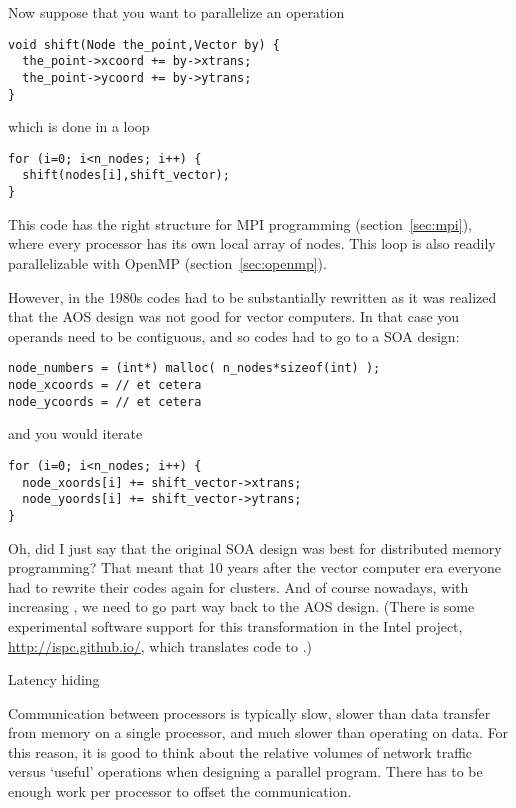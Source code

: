 Now suppose that you want to parallelize an operation
\lstset{language=C}
\begin{lstlisting}
void shift(Node the_point,Vector by) {
  the_point->xcoord += by->xtrans;
  the_point->ycoord += by->ytrans;
}
\end{lstlisting}
which is done in a loop
\lstset{language=C}
\begin{lstlisting}
for (i=0; i<n_nodes; i++) {
  shift(nodes[i],shift_vector);
}
\end{lstlisting}
This code has the right structure for MPI programming
(section~\ref{sec:mpi}), where every processor has its own local array
of nodes. This loop is also readily parallelizable with OpenMP
(section~\ref{sec:openmp}).

However, in the 1980s codes had to be substantially rewritten as it
was realized that the AOS design was not good for vector computers.
In that case you operands need to be contiguous, and so codes had to 
go to a SOA design:
\lstset{language=C}
\begin{lstlisting}
node_numbers = (int*) malloc( n_nodes*sizeof(int) );
node_xcoords = // et cetera
node_ycoords = // et cetera
\end{lstlisting}
and you would iterate
\lstset{language=C}
\begin{lstlisting}
for (i=0; i<n_nodes; i++) {
  node_xoords[i] += shift_vector->xtrans;
  node_yoords[i] += shift_vector->ytrans;
}
\end{lstlisting}

Oh, did I just say that the original SOA design was best for
distributed memory programming?  That meant that 10 years after the
vector computer era everyone had to rewrite their codes again for
clusters. And of course nowadays, with
increasing , we need to go part way back to
the AOS design.
(There is some experimental software support for this transformation
in the Intel  project, \url{http://ispc.github.io/},
which translates  code to .)

 {Latency hiding}
\label{sec:comcom-overlap}

Communication between processors is typically slow, slower than data
transfer from memory on a single processor, and much slower than
operating on data. For this reason, it is good to think about the
relative volumes of network traffic versus `useful' operations when
designing a parallel program. There has to be enough work per
processor to offset the communication.

